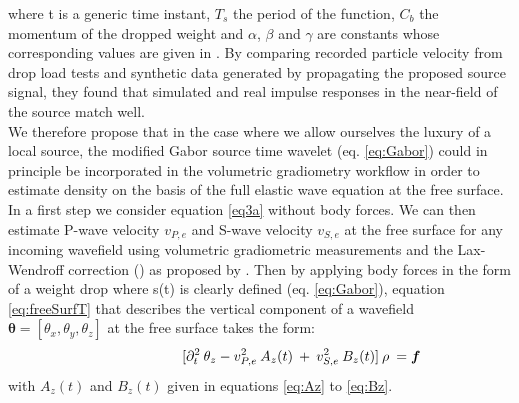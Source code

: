 \documentclass[]{article}
\begin{document}
	where t is a generic time instant, $T_{s}$ the period of the function, $C_{b}$ the momentum of the dropped weight and $\alpha$, $\beta$ and $\gamma$ are constants whose corresponding values are given in \textcite{colombero2015numerical}. By comparing recorded particle velocity from drop load tests and synthetic data generated by propagating the proposed source signal, they found that simulated and real impulse responses in the near-field of the source match well. \\ %
	 
	We therefore propose that in the case where we allow ourselves the luxury of a local source, the modified Gabor source time wavelet (eq. \ref{eq:Gabor}) could in principle be incorporated in the volumetric gradiometry workflow in order to estimate density on the basis of the full elastic wave equation at the free surface. In a first step we consider equation \eqref{eq3a} without body forces. We can then estimate P-wave velocity $v_{P,e}$ and S-wave velocity $v_{S,e}$ at the free surface for any incoming wavefield using volumetric gradiometric measurements and the Lax-Wendroff correction (\cite{lax1964difference}) as proposed by \textcite{curtis2002volumetric}. Then by applying body forces in the form of a weight drop where s(t) is clearly defined (eq. \ref{eq:Gabor}), equation \eqref{eq:freeSurfT} that describes the vertical component of a wavefield $\bm{\theta}=[\theta_{x}, \theta_{y}, \theta_{z}]$ at the free surface takes the form:
	\begin{align} \shoveright \shoveright \shoveright \shoveright \shoveright \shoveright 
 		[\partial_{t}^{2} \: \theta_{z} - v_{P,e}^{2} \: A_{z}(t) \: + \: v_{S,e}^{2} \: B_{z}(t)]   \: \rho	\: = \bm{f}
		\label{eq:freeSurf}   
	\end{align} 
	with $A_{z}(t)$ and $B_{z}(t)$ given in equations \eqref{eq:Az} to \eqref{eq:Bz}. %
\end{document}
